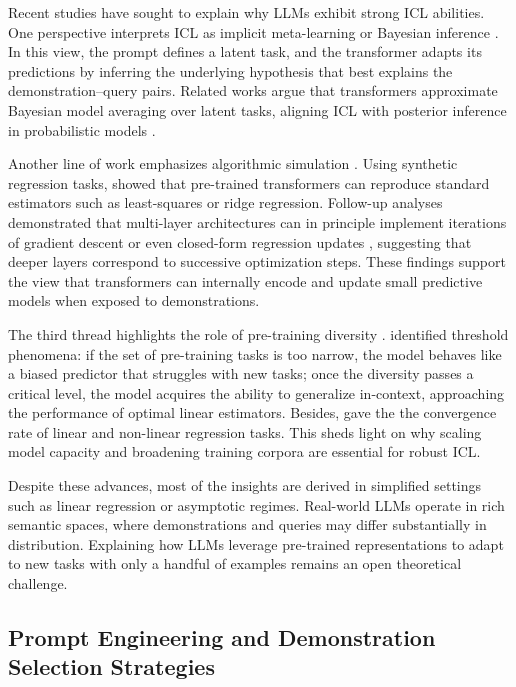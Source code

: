 \documentclass{article} %
\theoremstyle{plain} %
\begin{document}
Recent studies have sought to explain why LLMs exhibit strong ICL abilities. One perspective interprets ICL as implicit meta-learning or Bayesian inference \cite{xie2021explanation,dai2023can,li2023transformers}. In this view, the prompt defines a latent task, and the transformer adapts its predictions by inferring the underlying hypothesis that best explains the demonstration–query pairs. Related works argue that transformers approximate Bayesian model averaging over latent tasks, aligning ICL with posterior inference in probabilistic models \citep{zhou2023algorithms}.

Another line of work emphasizes algorithmic simulation \citep{garg2022can,akyureklearning,pan2023context}. Using synthetic regression tasks, \citet{garg2022can} showed that pre-trained transformers can reproduce standard estimators such as least-squares or ridge regression. Follow-up analyses demonstrated that multi-layer architectures can in principle implement iterations of gradient descent or even closed-form regression updates \citep{akyureklearning, von2023transformers}, suggesting that deeper layers correspond to successive optimization steps. These findings support the view that transformers can internally encode and update small predictive models when exposed to demonstrations.

The third thread highlights the role of pre-training diversity \citep{yang2024context,raventos2023pretraining}. \citet{raventos2023pretraining} identified threshold phenomena: if the set of pre-training tasks is too narrow, the model behaves like a biased predictor that struggles with new tasks; once the diversity passes a critical level, the model acquires the ability to generalize in-context, approaching the performance of optimal linear estimators. Besides, \citet{yang2024context} gave the the convergence rate of linear and non-linear regression tasks. This sheds light on why scaling model capacity and broadening training corpora are essential for robust ICL.

Despite these advances, most of the insights are derived in simplified settings such as linear regression or asymptotic regimes. Real-world LLMs operate in rich semantic spaces, where demonstrations and queries may differ substantially in distribution. Explaining how LLMs leverage pre-trained representations to adapt to new tasks with only a handful of examples remains an open theoretical challenge.

\subsection{Prompt Engineering and Demonstration Selection Strategies}
\end{document}
